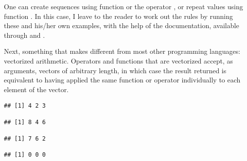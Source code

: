 \documentclass[krantz2]{krantz}\usepackage{knitr}
\begin{document}
\begin{playground}\label{pg:seq:rep}
One can create sequences using function  or the operator \Roperator{:}, or repeat values using function . In this case, I leave to the reader to work out the rules by running these and his/her own examples, with the help of the documentation, available through  and .

\begin{knitrout}\footnotesize
{}\color{fgcolor}\begin{kframe}
\begin{alltt}
 \hlkwb{<-} \hlopt{-}\hlopt{:}
 \hlkwb{<-} \hlopt{:-}
 \hlkwb{<-} \hlstd{(} \hlstd{=} \hlopt{-}\hlstd{,}  \hlstd{=} \hlstd{,}  \hlstd{=} \hlstd{)}
 \hlkwb{<-} \hlstd{(}\hlopt{-}\hlstd{,} \hlstd{)}
\end{alltt}
\end{kframe}
\end{knitrout}

\end{playground}

Next, something that makes \Rlang different from most other programming languages: vectorized arithmetic. Operators and functions that are vectorized accept, as arguments, vectors of arbitrary length, in which case the result returned is equivalent to having applied the same function or operator individually to each element of the vector.\label{par:vectorized:numeric}

\begin{knitrout}\footnotesize
{}\color{fgcolor}\begin{kframe}
\begin{alltt}
 \hlopt{+}  
\end{alltt}
\begin{verbatim}
## [1] 4 2 3
\end{verbatim}
\begin{alltt}
 \hlopt{+} \hlstd{)} \hlopt{*} 
\end{alltt}
\begin{verbatim}
## [1] 8 4 6
\end{verbatim}
\begin{alltt}
 \hlopt{+} 
\end{alltt}
\begin{verbatim}
## [1] 7 6 2
\end{verbatim}
\begin{alltt}
 \hlopt{-} 
\end{alltt}
\begin{verbatim}
## [1] 0 0 0
\end{verbatim}
\end{kframe}
\end{knitrout}
\end{document}
